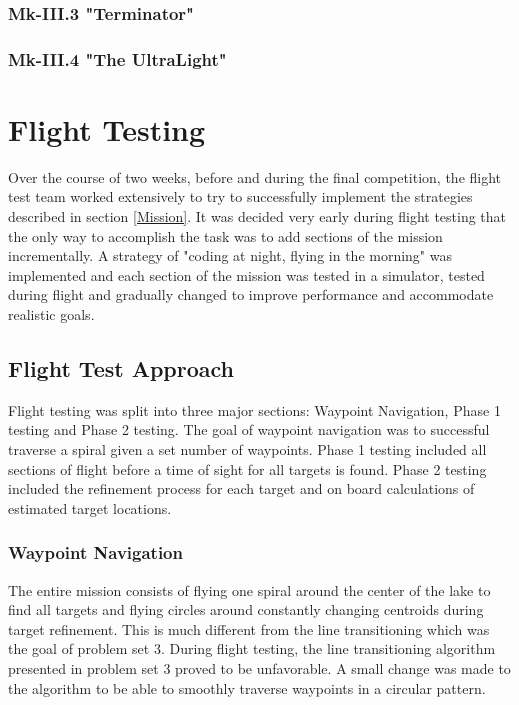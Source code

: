 \documentclass[11pt]{article}
\begin{document}
	\subsubsection{Mk-III.3 "Terminator"}
	\label{mk3.3}
	\subsubsection{Mk-III.4 "The UltraLight"}
	\label{mk3.4}

\section{Flight Testing}
	\label{FlightTesting}
	Over the course of two weeks, before and during the final competition, the flight test team worked extensively to try to successfully implement the strategies described in section \ref{Mission}. It was decided very early during flight testing that the only way to accomplish the task was to add sections of the mission incrementally. A strategy of "coding at night, flying in the morning" was implemented and each section of the mission was tested in a simulator, tested during flight and gradually changed to improve performance and accommodate realistic goals.

	\subsection{Flight Test Approach}
	\label{FltTstAppr}
	Flight testing was split into three major sections: Waypoint Navigation, Phase 1 testing and Phase 2 testing. The goal of waypoint navigation was to successful traverse a spiral given a set number of waypoints. Phase 1 testing included all sections of flight before a time of sight for all targets is found. Phase 2 testing included the refinement process for each target and on board calculations of estimated target locations.

	\subsubsection{Waypoint Navigation}
	The entire mission consists of flying one spiral around the center of the lake to find all targets and flying circles around constantly changing centroids during target refinement. This is much different from the line transitioning which was the goal of problem set 3. During flight testing, the line transitioning algorithm presented in problem set 3 proved to be unfavorable. A small change was made to the algorithm to be able to smoothly traverse waypoints in a circular pattern.\\
\end{document}
